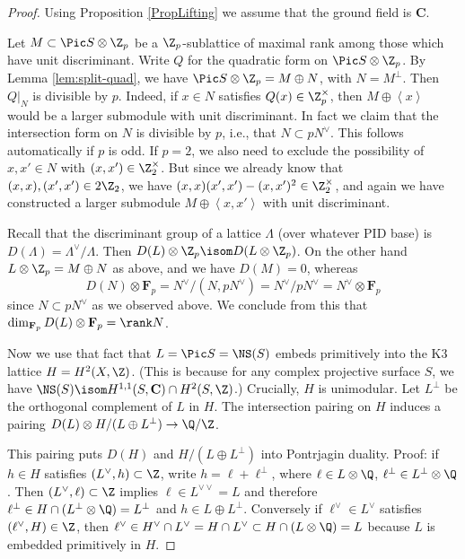 \documentclass{article}
\newcommand{\adam}[1]{\textcolor{blue}{#1}}
\def\F{\mathbf{F}}
\newcommand{\class}[1]{\left< #1 \right>}
\begin{document}

\begin{proof} Using Proposition \ref{PropLifting} we assume that the ground field is $\mathbf{C}$.

Let $M\subset \Pic S\otimes \Z_p$ be a $\Z_p$-sublattice of maximal rank among those which have unit discriminant.  Write $Q$ for the quadratic form on $\Pic S\otimes\Z_p$.  By Lemma \ref{lem:split-quad}, we have $\Pic S\otimes\Z_p=M\oplus N$, with $N=M^{\perp}$.  Then $Q\vert_{N}$ is divisible by $p$.  Indeed, if $x\in N$ satisfies $Q(x)\in\Z_p^\times$, then $M\oplus \class{x}$ would be a larger submodule with unit discriminant.  In fact we claim that the intersection form on $N$ is divisible by $p$, i.e., that $N\subset pN^\vee$.  This follows automatically if $p$ is odd.  If $p=2$, we also need to exclude the possibility of $x,x'\in N$ with $(x,x')\in\Z_2^\times$.  But since we already know that $(x,x),(x',x')\in 2\Z_2$, we have $(x,x)(x',x')-(x,x')^2\in\Z_2^\times$, and again we have constructed a larger submodule $M\oplus\class{x,x'}$ with unit discriminant.

Recall that the discriminant group of a lattice $\Lambda$ (over whatever PID base) is $D(\Lambda)=\Lambda^\vee/\Lambda$.   Then $D(L)\otimes\Z_p\isom D(L\otimes \Z_p)$.  On the other hand $L\otimes\Z_p=M\oplus N$ as above, and we have $D(M)=0$, whereas 
\[ D(N)\otimes \F_p=N^\vee/(N,pN^\vee)=N^\vee/pN^\vee =N^\vee \otimes\F_p \]
since $N\subset pN^\vee$ as we observed above.  We conclude from this that $\dim_{\F_p} D(L)\otimes\F_p=\rank N$. 

Now we use that fact that $L=\Pic S=\NS(S)$ embeds primitively into the K3 lattice $H=H^2(X,\Z)$.   (This is because for any complex projective surface $S$, we have $\NS(S)\isom H^{1,1}(S,\mathbf{C})\cap H^2(S,\Z)$.)   Crucially, $H$ is unimodular.  Let $L^\perp$ be the orthogonal complement of $L$ in $H$.  The intersection pairing on $H$ induces a pairing $D(L)\otimes H/(L\oplus L^\perp)\to \Q/\Z$. 

This pairing puts $D(H)$ and $H/(L\oplus L^\perp)$ into Pontrjagin duality. 
Proof: if $h\in H$ satisfies $(L^\vee,h)\subset\Z$, write $h=\ell+\ell^\perp$, where $\ell\in L\otimes\Q$, $\ell^\perp\in L^\perp \otimes\Q$. Then $(L^\vee,\ell)\subset\Z$ implies $\ell\in L^{\vee\vee}=L$ and therefore $\ell^\perp\in H\cap (L^\perp\otimes\Q)=L^\perp$ and $h\in L\oplus L^\perp$.  Conversely if $\ell^\vee\in L^\vee$ satisfies $(\ell^\vee, H)\in\Z$, then $\ell^\vee\in H^\vee\cap L^\vee = H\cap L^\vee \subset H\cap (L\otimes\Q)=L$ because $L$ is embedded primitively in $H$.


\end{proof}
\end{document}
